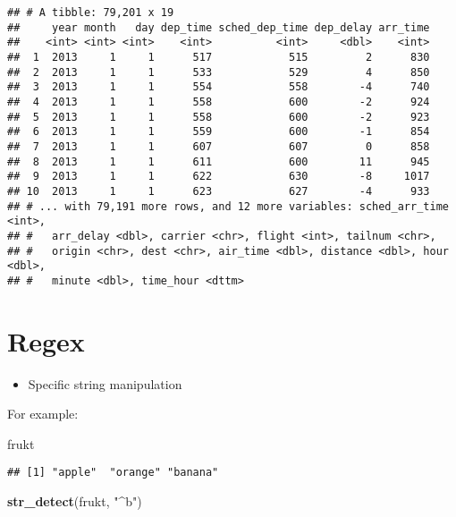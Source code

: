 \documentclass[]{book}
\newenvironment{Shaded}{\begin{snugshade}}{\end{snugshade}}
\newcommand{\KeywordTok}[1]{\textcolor[rgb]{0.13,0.29,0.53}{\textbf{#1}}}
\newcommand{\NormalTok}[1]{#1}
\newcommand{\StringTok}[1]{\textcolor[rgb]{0.31,0.60,0.02}{#1}}
\providecommand{\tightlist}{%
  \setlength{\itemsep}{0pt}\setlength{\parskip}{0pt}}
\begin{document}
\begin{verbatim}
## # A tibble: 79,201 x 19
##     year month   day dep_time sched_dep_time dep_delay arr_time
##    <int> <int> <int>    <int>          <int>     <dbl>    <int>
##  1  2013     1     1      517            515         2      830
##  2  2013     1     1      533            529         4      850
##  3  2013     1     1      554            558        -4      740
##  4  2013     1     1      558            600        -2      924
##  5  2013     1     1      558            600        -2      923
##  6  2013     1     1      559            600        -1      854
##  7  2013     1     1      607            607         0      858
##  8  2013     1     1      611            600        11      945
##  9  2013     1     1      622            630        -8     1017
## 10  2013     1     1      623            627        -4      933
## # ... with 79,191 more rows, and 12 more variables: sched_arr_time <int>,
## #   arr_delay <dbl>, carrier <chr>, flight <int>, tailnum <chr>,
## #   origin <chr>, dest <chr>, air_time <dbl>, distance <dbl>, hour <dbl>,
## #   minute <dbl>, time_hour <dttm>
\end{verbatim}

\hypertarget{regex}{%
\section{Regex}\label{regex}}

\begin{itemize}
\tightlist
\item
  Specific string manipulation
\end{itemize}

For example:

\begin{Shaded}
\begin{Highlighting}[]
\NormalTok{frukt}
\end{Highlighting}
\end{Shaded}

\begin{verbatim}
## [1] "apple"  "orange" "banana"
\end{verbatim}

\begin{Shaded}
\begin{Highlighting}[]
\KeywordTok{str_detect}\NormalTok{(frukt, }\StringTok{"^b"}\NormalTok{)}
\end{Highlighting}
\end{Shaded}
\end{document}
